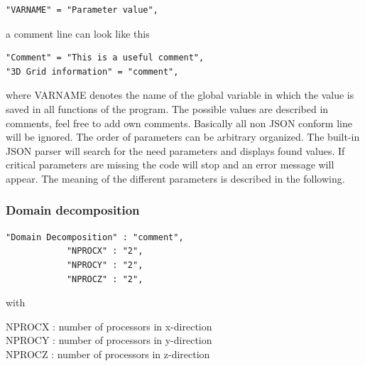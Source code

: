 \documentclass[11pt,onecolumn,oneside]{article}
\begin{document}
\begin{verbatim}
"VARNAME" = "Parameter value",
\end{verbatim}

a comment line can look like this

\begin{verbatim}
"Comment" = "This is a useful comment",
"3D Grid information" = "comment",
\end{verbatim}

where VARNAME denotes the name of the global variable in which the value is saved in all functions of the program. The possible values are described in comments, feel free to add own comments. Basically all non JSON conform line will be ignored. The order of parameters can be arbitrary organized. The built-in JSON parser will search for the need parameters and displays found values. If critical parameters are missing the code will stop and an error message will appear. The meaning of the different parameters is described in the following.

\subsubsection{Domain decomposition}

\begin{verbatim}
"Domain Decomposition" : "comment",
            "NPROCX" : "2",
            "NPROCY" : "2",
            "NPROCZ" : "2",
\end{verbatim}

with

NPROCX : number of processors in x-direction\\
NPROCY : number of processors in y-direction\\
NPROCZ : number of processors in z-direction\\
\end{document}
